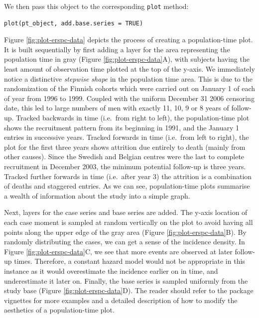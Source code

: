 We then pass this object to the corresponding \texttt{plot} method:

\begin{verbatim}
plot(pt_object, add.base.series = TRUE)
\end{verbatim}

Figure \ref{fig:plot-erspc-data} depicts the process of creating a population-time plot. It is built sequentially by first adding a layer for the area representing the population time in gray (Figure \ref{fig:plot-erspc-data}A), with subjects having the least amount of observation time plotted at the top of the y-axis. We immediately notice a distinctive \emph{stepwise shape} in the population time area. This is due to the randomization of the Finnish cohorts which were carried out on January 1 of each of year from 1996 to 1999. Coupled with the uniform December 31 2006 censoring date, this led to large numbers of men with exactly 11, 10, 9 or 8 years of follow-up. Tracked backwards in time (i.e.~from right to left), the population-time plot shows the recruitment pattern from its beginning in 1991, and the January 1 entries in successive years. Tracked forwards in time (i.e.~from left to right), the plot for the first three years shows attrition due entirely to death (mainly from other causes). Since the Swedish and Belgian centres were the last to complete recruitment in December 2003, the minimum potential follow-up is three years. Tracked further forwards in time (i.e.~after year 3) the attrition is a combination of deaths and staggered entries. As we can see, population-time plots summarise a wealth of information about the study into a simple graph.

Next, layers for the case series and base series are added. The y-axis location of each case moment is sampled at random vertically on the plot to avoid having all points along the upper edge of the gray area (Figure \ref{fig:plot-erspc-data}B). By randomly distributing the cases, we can get a sense of the incidence density. In Figure \ref{fig:plot-erspc-data}C, we see that more events are observed at later follow-up times. Therefore, a constant hazard model would not be appropriate in this instance as it would overestimate the incidence earlier on in time, and underestimate it later on. Finally, the base series is sampled uniformly from the study base (Figure \ref{fig:plot-erspc-data}D). The reader should refer to the package vignettes for more examples and a detailed description of how to modify the aesthetics of a population-time plot.

